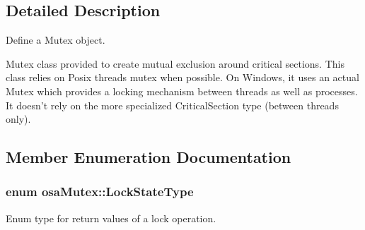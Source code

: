 \subsection{Detailed Description}
Define a Mutex object. 

Mutex class provided to create mutual exclusion around critical sections. This class relies on Posix threads mutex when possible. On Windows, it uses an actual Mutex which provides a locking mechanism between threads as well as processes. It doesn't rely on the more specialized Critical\-Section type (between threads only). 

\subsection{Member Enumeration Documentation}
\hypertarget{classosa_mutex_ad75274806c7433f960e8ff0c8c9d7470}{
\subsubsection[{Lock\-State\-Type}]{\setlength{\rightskip}{0pt plus 5cm}enum {\bf osa\-Mutex\-::\-Lock\-State\-Type}}}\label{classosa_mutex_ad75274806c7433f960e8ff0c8c9d7470}
Enum type for return values of a lock operation.

